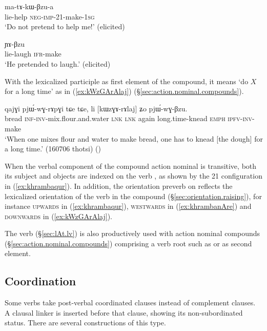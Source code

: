 \begin{exe}
	\ex \label{ex:khrambaqur}
	 ma-tɤ-kɯ-βzu-a \\
	lie-help \textsc{neg}-\textsc{imp}-2\fl{}1-make-\textsc{1sg} \\
	\glt `Do not pretend to help me!' (elicited)
\end{exe}

\begin{exe}
	\ex \label{ex:khrambanAre}
	 ɲɤ-βzu \\
	lie-laugh \textsc{ifr}-make \\
	\glt `He pretended to laugh.' (elicited)
\end{exe}

With the lexicalized participle  as first element of the compound, it means `do $X$ for a long time' as in (\ref{ex:kWzGArAlaj}) (§\ref{sec:action.nominal.compounds}). 

\begin{exe}
	\ex \label{ex:kWzGArAlaj}
	\gll qajɣi pjɯ́-wɣ-rɤpɣi tɕe tɕe, li [kɯzɣɤ-rɤlaj] ʑo pjɯ́-wɣ-βzu. \\
	bread \textsc{inf}-\textsc{inv}-mix.flour.and.water \textsc{lnk} \textsc{lnk} again long.time-knead \textsc{emph} \textsc{ipfv}-\textsc{inv}-make \\
	\glt `When one mixes flour and water to make bread, one has to knead [the dough] for a long time.' (160706 thotsi)
()
\end{exe}

When the verbal component of the compound action nominal is transitive, both its subject and objects are indexed on the verb , as shown by the 2\fl{}1 configuration in (\ref{ex:khrambaqur}). In addition, the orientation preverb on  reflects the lexicalized orientation of the verb in the compound (§\ref{sec:orientation.raising}), for instance \textsc{upwards} in (\ref{ex:khrambaqur}),  \textsc{westwards} in (\ref{ex:khrambanAre}) and \textsc{downwards} in (\ref{ex:kWzGArAlaj}).


The verb  (§\ref{sec:lAt.lv}) is also productively used with action nominal compounds (§\ref{sec:action.nominal.compounds}) comprising a verb root such as  or  as second element.


\subsection{Coordination} \label{sec:coordination.comp.str}
Some verbs take post-verbal coordinated clauses instead of complement clauses. A clausal linker is inserted before that clause, showing its non-subordinated status. There are several constructions of this type.

